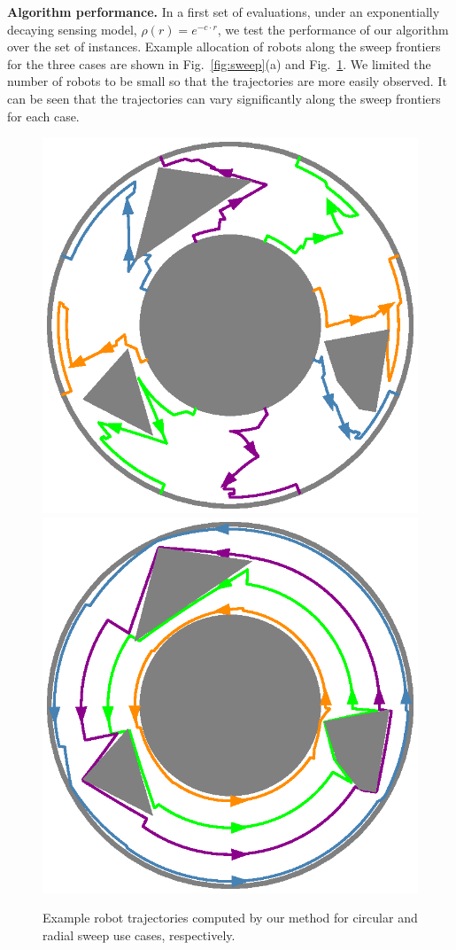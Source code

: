 \textbf{Algorithm performance.} In a first set of evaluations, under an exponentially 
decaying sensing 
model, $\rho(r) = e^{-c\cdot r}$, we test the performance of our algorithm over 
the set of instances. Example allocation of robots along the sweep frontiers for 
the three cases are shown in Fig.~\ref{fig:sweep}(a) and Fig.~\ref{fig:simulations}. 
We limited the number of robots to be small so that the trajectories are more easily 
observed. It can be seen that the trajectories can vary significantly along the 
sweep frontiers for each case. 
\begin{figure}[ht]
    \centering
    \includegraphics[width=.45\linewidth]{chapters/sc/fig/circular_sol.eps}\hspace{2mm}
    \includegraphics[width=.45\linewidth]{chapters/sc/fig/rotational_sol.eps}
    
    \caption{Example robot trajectories computed by our method for circular and radial 
    sweep use cases, respectively.
    }
    \label{fig:simulations}
\end{figure}

